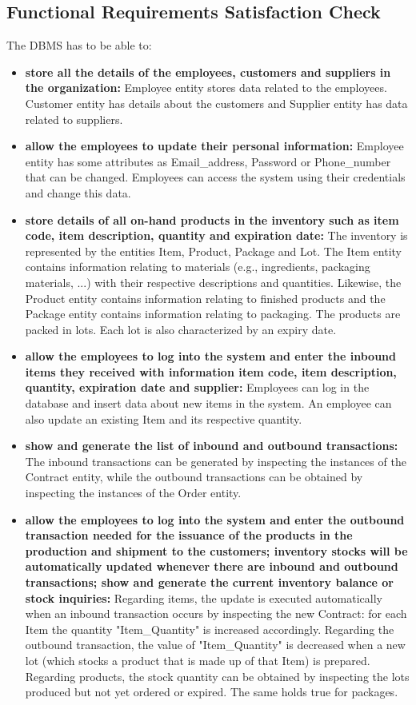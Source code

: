 \subsection{Functional Requirements Satisfaction Check}

The DBMS has to be able to:
\begin{itemize}
	\item \textbf{store all the details of the employees, customers and suppliers in the organization:} Employee entity stores data related to the employees. Customer entity has details about the customers and Supplier entity has data related to suppliers.
	\item \textbf{allow the employees to update their personal information:} Employee entity has some attributes as Email\_address, Password or Phone\_number that can be changed. Employees can access the system using their credentials and change this data.
	\item \textbf{store details of all on-hand products in the inventory such as item code, item description, quantity and expiration date:} The inventory is represented by the entities Item, Product, Package and Lot. The Item entity contains information relating to materials (e.g., ingredients, packaging materials, ...) with their respective descriptions and quantities. Likewise, the Product entity contains information relating to finished products and the Package entity contains information relating to packaging. The products are packed in lots. Each lot is also characterized by an expiry date.
	\item \textbf{allow the employees to log into the system and enter the inbound items they received with information item code, item description, quantity, expiration date and supplier:} Employees can log in the database and insert data about new items in the system. An employee can also update an existing Item and its respective quantity.
	\item \textbf{show and generate the list of inbound and outbound transactions:} The inbound transactions can be generated by inspecting the instances of the Contract entity, while the outbound transactions can be obtained by inspecting the instances of the Order entity.
	\item \textbf{allow the employees to log into the system and enter the outbound transaction needed for the issuance of the products in the production and shipment to the customers; inventory stocks will be automatically updated whenever there are inbound and outbound transactions; show and generate the current inventory balance or stock inquiries: } Regarding items, the update is executed automatically when an inbound transaction occurs by inspecting the new Contract: for each Item the quantity "Item\_Quantity" is increased accordingly. Regarding the outbound transaction, the value of "Item\_Quantity" is decreased when a new lot (which stocks a product that is made up of that Item) is prepared. Regarding products, the stock quantity can be obtained by inspecting the lots produced but not yet ordered or expired. The same holds true for packages.


\end{itemize}
